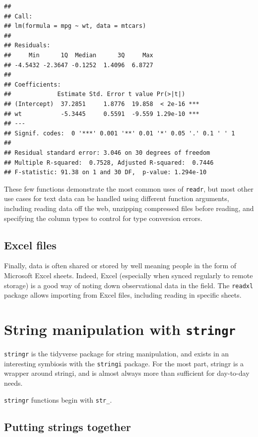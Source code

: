 \documentclass[]{book}
\begin{document}
\begin{verbatim}
## 
## Call:
## lm(formula = mpg ~ wt, data = mtcars)
## 
## Residuals:
##     Min      1Q  Median      3Q     Max 
## -4.5432 -2.3647 -0.1252  1.4096  6.8727 
## 
## Coefficients:
##             Estimate Std. Error t value Pr(>|t|)    
## (Intercept)  37.2851     1.8776  19.858  < 2e-16 ***
## wt           -5.3445     0.5591  -9.559 1.29e-10 ***
## ---
## Signif. codes:  0 '***' 0.001 '**' 0.01 '*' 0.05 '.' 0.1 ' ' 1
## 
## Residual standard error: 3.046 on 30 degrees of freedom
## Multiple R-squared:  0.7528, Adjusted R-squared:  0.7446 
## F-statistic: 91.38 on 1 and 30 DF,  p-value: 1.294e-10
\end{verbatim}

These few functions demonstrate the most common uses of \texttt{readr}, but most other use cases for text data can be handled using different function arguments, including reading data off the web, unzipping
compressed files before reading, and specifying the column types to control for type conversion errors.

\hypertarget{excel-files}{%
\subsection*{Excel files}\label{excel-files}}

Finally, data is often shared or stored by well meaning people in the form of Microsoft Excel sheets. Indeed, Excel (especially when synced regularly to remote storage) is a good way of noting down observational data in the field. The \texttt{readxl} package allows importing from Excel files, including reading in specific sheets.

\hypertarget{string-manipulation-with-stringr}{%
\section{\texorpdfstring{String manipulation with \texttt{stringr}}{String manipulation with stringr}}\label{string-manipulation-with-stringr}}

\texttt{stringr} is the tidyverse package for string manipulation, and exists in an interesting symbiosis with the \texttt{stringi} package. For the most part, stringr is a wrapper around stringi, and is almost always more than sufficient for day-to-day needs.

\texttt{stringr} functions begin with \texttt{str\_}.

\hypertarget{putting-strings-together}{%
\subsection{Putting strings together}\label{putting-strings-together}}
\end{document}
